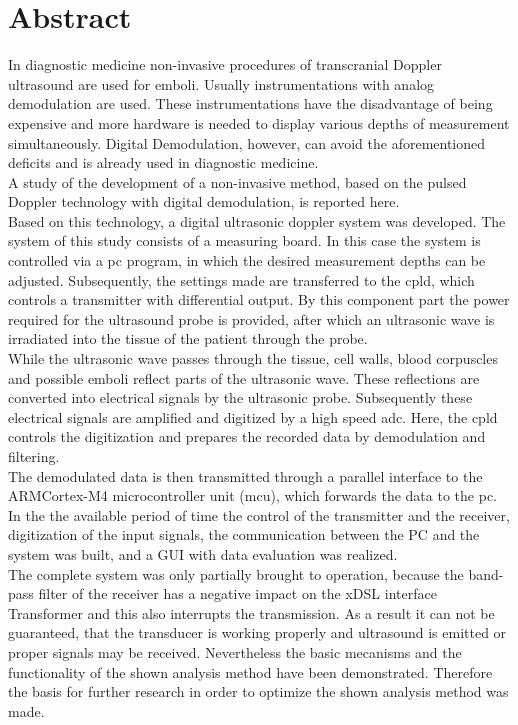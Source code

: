 \newpage
\chapter*{Abstract}
In diagnostic medicine non-invasive procedures of transcranial Doppler ultrasound are used for emboli. Usually instrumentations with analog demodulation are used. These instrumentations have the disadvantage of being expensive and more hardware is needed to display various depths of measurement simultaneously. Digital Demodulation, however, can avoid the aforementioned deficits and is already used in diagnostic medicine.\\
A study of the development of a non-invasive method, based on the pulsed Doppler technology with digital demodulation, is reported here.\\
Based on this technology, a digital ultrasonic doppler system was developed. The system of this study consists of a measuring board. In this case the system is controlled via a \acf{pc} program, in which the desired measurement depths can be adjusted.
Subsequently, the settings made are transferred to the \acf{cpld}, which controls a transmitter with differential output. By this component part the power required for the ultrasound probe is provided, after which an ultrasonic wave is irradiated into the tissue of the patient through the probe.\\
While the ultrasonic wave passes through the tissue, cell walls, blood corpuscles and possible emboli reflect parts of the ultrasonic wave.
These reflections are converted into electrical signals by the ultrasonic probe. Subsequently these electrical signals are amplified and digitized by a high speed \acf{adc}. Here, the \ac{cpld} controls the digitization and prepares the recorded data by demodulation and filtering.\\
The demodulated data is then transmitted through a parallel interface to the ARM\SymbReg Cortex\SymbReg-M4  microcontroller unit (\acs{mcu}), which forwards the data to the \ac{pc}.\\
In the the available period of time the control of the transmitter and the receiver, digitization of the input signals, the communication between the PC and the system was built, and a GUI with data evaluation was realized.\\
The complete system was only partially brought to operation, because the band-pass filter of the receiver has a negative impact on the xDSL interface Transformer and this also interrupts the transmission. As a result it can not be guaranteed, that the transducer is working properly and ultrasound is emitted or proper signals may be received.
Nevertheless the basic mecanisms and the functionality of the shown analysis method have been demonstrated. Therefore the basis for further research in order to optimize the shown analysis method was made.